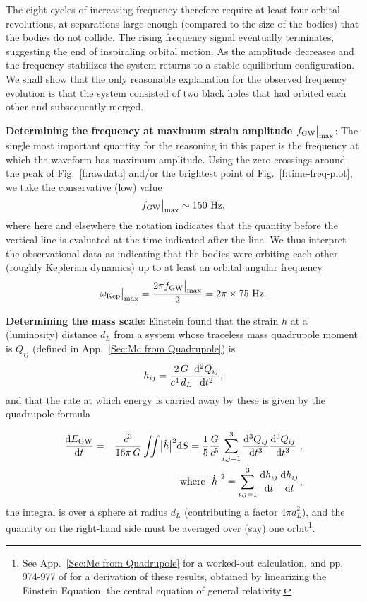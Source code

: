 \documentclass{andp2012}%
\def\w{\omega}
\def\D{{\rm d}}
\newcommand{\inlinecite}[1]{\cite{#1}}
\newcommand{\refigure}[1]{Fig.~\ref{#1}}
\newcommand{\refigures}[1]{Figs.~\ref{#1}}
\newcommand{\refapp}[1]{App.\ \ref{#1}}
\def\submax{\big|_{\rm max}}
\def\fgwmax{f_{\rm GW} \submax}
\def\wkep{\w_{\rm Kep}}
\def\wkepmax{\wkep\submax}
\newcommand{\CHIRPFSTRAINPEAK}{\ensuremath{150}} %
\begin{document}
The eight \GW cycles of increasing frequency therefore require
at least four orbital revolutions, at separations large enough
(compared to the size of the bodies) that the bodies do not collide.
The rising frequency signal eventually terminates,
suggesting the end of inspiraling orbital motion.
As the amplitude decreases and the frequency stabilizes
the system returns to a stable equilibrium configuration.
We shall show that the only reasonable explanation for the
observed frequency evolution is that the system consisted
of two black holes that had orbited each other and subsequently merged.

{\bf Determining the frequency at maximum strain amplitude $\fgwmax$}:
The single most important quantity for the reasoning in this paper is
the \GW frequency at which the waveform has maximum amplitude.
Using the zero-crossings around the peak of \refigure{f:rawdata}
and/or the brightest point of \refigure{f:time-freq-plot},
we take the conservative (low) value
\begin{equation}
  \fgwmax \sim \CHIRPFSTRAINPEAK ~\rm{Hz},
\end{equation}
where here and elsewhere the notation indicates that the quantity
before the vertical line is evaluated at the time indicated after the line.
We thus interpret the observational data as indicating that the bodies were orbiting each other
(roughly Keplerian dynamics)
up to at least an orbital angular frequency
\begin{equation}
  \wkepmax = \frac{2\pi \fgwmax}{2} = 2\pi \times 75~\rm{Hz}.
\end{equation}

{\bf Determining the mass scale}:
Einstein found\cite{EinsteinGW} that the \GW strain $h$
at a (luminosity) distance $d_L$ from a system
whose traceless mass quadrupole moment is $Q_{ij}$
(defined in \refapp{Sec:Mc from Quadrupole})
is
\begin{equation}
  \label{e:quadrupole strain}
  h_{ij} = \frac{2 \, G}{c^4 \, d_L} \frac{\D^2 Q_{ij}}{\D t^2},
\end{equation}
and that the rate at which energy is carried away by these \GWs
is given by the quadrupole formula\cite{EinsteinGW}

\begin{eqnarray}
  \label{e:quadrupole2}
  \frac{\D E_{\rm GW}}{\D t}
  & = & \frac{c^3}{16\pi \, G} \iint \bigl| \dot{h} \bigr|^2
      \D S  
      =  \frac{1}{5} \frac{G}{c^5}\sum_{i,j=1}^3  \frac{\D^3 Q_{ij}}{\D t^3}\frac{\D^3 Q_{ij}}{\D t^3}  ~,\\
\nonumber
&& {\rm where\ } \bigl| \dot{h} \bigr|^2 =  \sum_{i,j=1}^3
      \frac{\D h_{ij}}{\D t}
      \frac{\D h_{ij}}{\D t} ,
\end{eqnarray}
the integral is over a sphere at radius $d_L$
(contributing a factor $4\pi d_L^2$),
and the quantity on the right-hand side must be averaged
over (say) one orbit\footnote{See
\refapp{Sec:Mc from Quadrupole}
for a worked-out calculation,
and pp. 974-977 of \inlinecite{MTW}
for a derivation of these results,
obtained by linearizing the Einstein Equation,
the central equation of general relativity.}.
\end{document}
